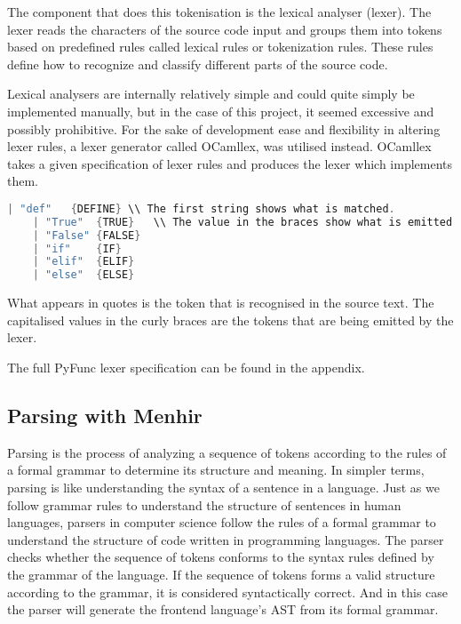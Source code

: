 \documentclass{l4proj}
\begin{document}
The component that does this tokenisation is the lexical analyser (lexer).
The lexer reads the characters of the source code input and groups them into tokens based on predefined rules called lexical rules or tokenization rules.
These rules define how to recognize and classify different parts of the source code.

Lexical analysers are internally relatively simple and could quite simply be implemented manually, but in the case of this project, it seemed excessive and possibly prohibitive.
For the sake of development ease and flexibility in altering lexer rules, a lexer generator called OCamllex, was utilised instead.
OCamllex takes a given specification of lexer rules and produces the lexer which implements them.


\begin{lstlisting}[language=C, keepspaces=true, caption=A small extract of the PyFunc lexer\, showing the syntax of the lexer specification.]
    | "def"   {DEFINE} \\ The first string shows what is matched.
    | "True"  {TRUE}   \\ The value in the braces show what is emitted.
    | "False" {FALSE}
    | "if"    {IF}
    | "elif"  {ELIF}
    | "else"  {ELSE}
\end{lstlisting}
What appears in quotes is the token that is recognised in the source text.
The capitalised values in the curly braces are the tokens that are being emitted by the lexer.

The full PyFunc lexer specification can be found in the appendix.


\subsection{Parsing with Menhir}

Parsing is the process of analyzing a sequence of tokens according to the rules of a formal grammar to determine its structure and meaning.
In simpler terms, parsing is like understanding the syntax of a sentence in a language.
Just as we follow grammar rules to understand the structure of sentences in human languages, parsers in computer science follow the rules of a formal grammar to understand the structure of code written in programming languages.
The parser checks whether the sequence of tokens conforms to the syntax rules defined by the grammar of the language.
If the sequence of tokens forms a valid structure according to the grammar, it is considered syntactically correct.
And in this case the parser will generate the frontend language's AST from its formal grammar.
\end{document}
